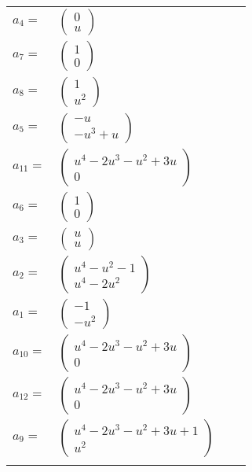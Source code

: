 \documentclass[1p]{elsarticle_modified}
\theoremstyle{definition}
\begin{document}
\begin{tabular}{m{7pt} m{180pt} m{7pt} m{180pt} }
\flushright $a_{4}=$&$\begin{pmatrix}0\\u\end{pmatrix}$ \\
\flushright $a_{7}=$&$\begin{pmatrix}1\\0\end{pmatrix}$ \\
\flushright $a_{8}=$&$\begin{pmatrix}1\\u^2\end{pmatrix}$ \\
\flushright $a_{5}=$&$\begin{pmatrix}- u\\- u^3+u\end{pmatrix}$ \\
\flushright $a_{11}=$&$\begin{pmatrix}u^4-2 u^3- u^2+3 u\\0\end{pmatrix}$ \\
\flushright $a_{6}=$&$\begin{pmatrix}1\\0\end{pmatrix}$ \\
\flushright $a_{3}=$&$\begin{pmatrix}u\\u\end{pmatrix}$ \\
\flushright $a_{2}=$&$\begin{pmatrix}u^4- u^2-1\\u^4-2 u^2\end{pmatrix}$ \\
\flushright $a_{1}=$&$\begin{pmatrix}-1\\- u^2\end{pmatrix}$ \\
\flushright $a_{10}=$&$\begin{pmatrix}u^4-2 u^3- u^2+3 u\\0\end{pmatrix}$ \\
\flushright $a_{12}=$&$\begin{pmatrix}u^4-2 u^3- u^2+3 u\\0\end{pmatrix}$ \\
\flushright $a_{9}=$&$\begin{pmatrix}u^4-2 u^3- u^2+3 u+1\\u^2\end{pmatrix}$\\&\end{tabular}
\end{document}
